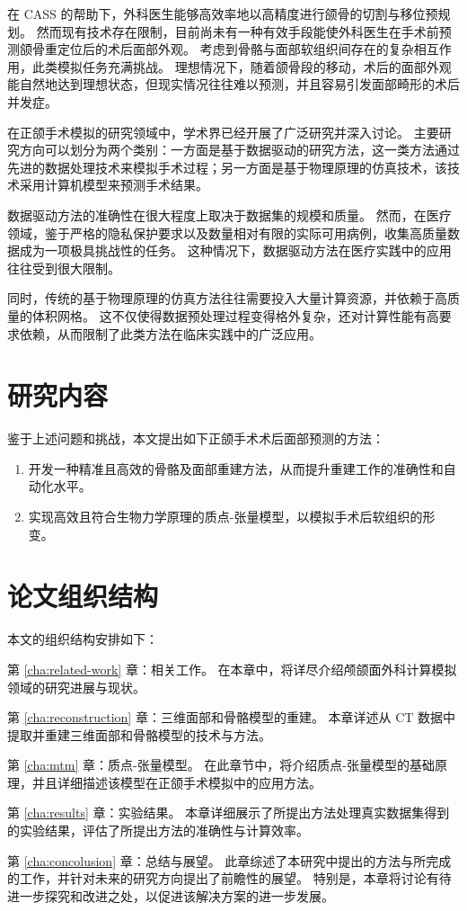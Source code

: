 在 CASS 的帮助下，外科医生能够高效率地以高精度进行颌骨的切割与移位预规划。
然而现有技术存在限制，目前尚未有一种有效手段能使外科医生在手术前预测颌骨重定位后的术后面部外观。
考虑到骨骼与面部软组织间存在的复杂相互作用，此类模拟任务充满挑战。
理想情况下，随着颌骨段的移动，术后的面部外观能自然地达到理想状态，但现实情况往往难以预测，并且容易引发面部畸形的术后并发症。

在正颌手术模拟的研究领域中，学术界已经开展了广泛研究并深入讨论。
主要研究方向可以划分为两个类别：一方面是基于数据驱动的研究方法，这一类方法通过先进的数据处理技术来模拟手术过程；另一方面是基于物理原理的仿真技术，该技术采用计算机模型来预测手术结果。

数据驱动方法的准确性在很大程度上取决于数据集的规模和质量。
然而，在医疗领域，鉴于严格的隐私保护要求以及数量相对有限的实际可用病例，收集高质量数据成为一项极具挑战性的任务。
这种情况下，数据驱动方法在医疗实践中的应用往往受到很大限制。

同时，传统的基于物理原理的仿真方法往往需要投入大量计算资源，并依赖于高质量的体积网格。
这不仅使得数据预处理过程变得格外复杂，还对计算性能有高要求依赖，从而限制了此类方法在临床实践中的广泛应用。

\section{研究内容}

鉴于上述问题和挑战，本文提出如下正颌手术术后面部预测的方法：
\begin{enumerate}
  \item 开发一种精准且高效的骨骼及面部重建方法，从而提升重建工作的准确性和自动化水平。
  \item 实现高效且符合生物力学原理的质点-张量模型，以模拟手术后软组织的形变。
\end{enumerate}

\section{论文组织结构}

本文的组织结构安排如下：

第 \ref{cha:related-work} 章：相关工作。
在本章中，将详尽介绍颅颌面外科计算模拟领域的研究进展与现状。

第 \ref{cha:reconstruction} 章：三维面部和骨骼模型的重建。
本章详述从 CT 数据中提取并重建三维面部和骨骼模型的技术与方法。

第 \ref{cha:mtm} 章：质点-张量模型。
在此章节中，将介绍质点-张量模型的基础原理，并且详细描述该模型在正颌手术模拟中的应用方法。

第 \ref{cha:results} 章：实验结果。
本章详细展示了所提出方法处理真实数据集得到的实验结果，评估了所提出方法的准确性与计算效率。

第 \ref{cha:concolusion} 章：总结与展望。
此章综述了本研究中提出的方法与所完成的工作，并针对未来的研究方向提出了前瞻性的展望。
特别是，本章将讨论有待进一步探究和改进之处，以促进该解决方案的进一步发展。
